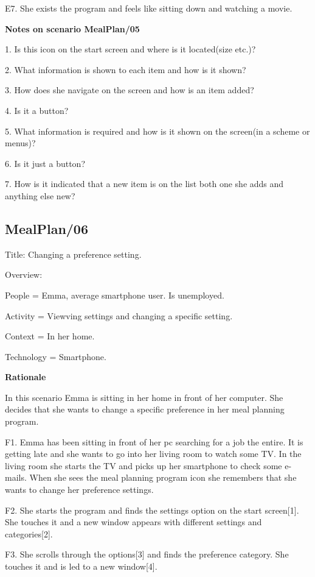 	E7. She exists the program and feels like sitting down and watching a movie.

\textbf{Notes on scenario MealPlan/05}

1. Is this icon on the start screen and where is it located(size etc.)?

2. What information is shown to each item and how is it shown?

3. How does she navigate on the screen and how is an item added?

4. Is it a button?

5. What information is required and how is it shown on the screen(in a scheme or menus)?

6. Is it just a button?

7. How is it indicated that a new item is on the list both one she adds and anything else new?

\subsection{MealPlan/06} \label{MealPlan06}

Title: Changing a preference setting.

Overview:

	People = Emma, average smartphone user. Is unemployed.

	Activity = Viewving settings and changing a specific setting.

	Context = In her home.

	Technology = Smartphone.

\textbf{Rationale}

In this scenario Emma is sitting in her home in front of her computer. She decides that she wants to change a specific preference in her meal planning program.

	F1. Emma has been sitting in front of her pc searching for a job the entire. It is getting late and she wants to go into her living room to watch some TV. In the living room she starts the TV and picks up her smartphone to check some e-mails. When she sees the meal planning program icon she remembers that she wants to change her preference settings.
	
	F2. She starts the program and finds the settings option on the start screen[1]. She touches it and a new window appears with different settings and categories[2].
	
	F3. She scrolls through the options[3] and finds the preference category. She touches it and is led to a new window[4].
	
